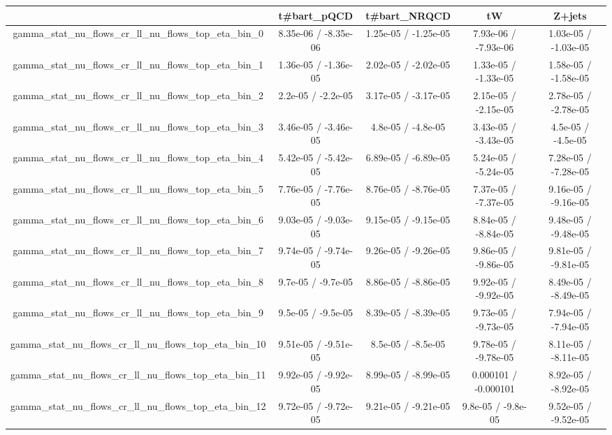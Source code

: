 \documentclass[10pt]{article}
\begin{document}
\begin{table}[htbp]
\begin{center}
\begin{tabular}{|c|c|c|c|c|}
\hline 
      & t#bar{t}_{pQCD}      & t#bar{t}_{NRQCD}      & tW      & Z+jets \\ 
\hline 
  gamma_stat_nu_flows_cr_ll_nu_flows_top_eta_bin_0 & 8.35e-06 / -8.35e-06 & 1.25e-05 / -1.25e-05 & 7.93e-06 / -7.93e-06 & 1.03e-05 / -1.03e-05 \\ 
  gamma_stat_nu_flows_cr_ll_nu_flows_top_eta_bin_1 & 1.36e-05 / -1.36e-05 & 2.02e-05 / -2.02e-05 & 1.33e-05 / -1.33e-05 & 1.58e-05 / -1.58e-05 \\ 
  gamma_stat_nu_flows_cr_ll_nu_flows_top_eta_bin_2 & 2.2e-05 / -2.2e-05 & 3.17e-05 / -3.17e-05 & 2.15e-05 / -2.15e-05 & 2.78e-05 / -2.78e-05 \\ 
  gamma_stat_nu_flows_cr_ll_nu_flows_top_eta_bin_3 & 3.46e-05 / -3.46e-05 & 4.8e-05 / -4.8e-05 & 3.43e-05 / -3.43e-05 & 4.5e-05 / -4.5e-05 \\ 
  gamma_stat_nu_flows_cr_ll_nu_flows_top_eta_bin_4 & 5.42e-05 / -5.42e-05 & 6.89e-05 / -6.89e-05 & 5.24e-05 / -5.24e-05 & 7.28e-05 / -7.28e-05 \\ 
  gamma_stat_nu_flows_cr_ll_nu_flows_top_eta_bin_5 & 7.76e-05 / -7.76e-05 & 8.76e-05 / -8.76e-05 & 7.37e-05 / -7.37e-05 & 9.16e-05 / -9.16e-05 \\ 
  gamma_stat_nu_flows_cr_ll_nu_flows_top_eta_bin_6 & 9.03e-05 / -9.03e-05 & 9.15e-05 / -9.15e-05 & 8.84e-05 / -8.84e-05 & 9.48e-05 / -9.48e-05 \\ 
  gamma_stat_nu_flows_cr_ll_nu_flows_top_eta_bin_7 & 9.74e-05 / -9.74e-05 & 9.26e-05 / -9.26e-05 & 9.86e-05 / -9.86e-05 & 9.81e-05 / -9.81e-05 \\ 
  gamma_stat_nu_flows_cr_ll_nu_flows_top_eta_bin_8 & 9.7e-05 / -9.7e-05 & 8.86e-05 / -8.86e-05 & 9.92e-05 / -9.92e-05 & 8.49e-05 / -8.49e-05 \\ 
  gamma_stat_nu_flows_cr_ll_nu_flows_top_eta_bin_9 & 9.5e-05 / -9.5e-05 & 8.39e-05 / -8.39e-05 & 9.73e-05 / -9.73e-05 & 7.94e-05 / -7.94e-05 \\ 
  gamma_stat_nu_flows_cr_ll_nu_flows_top_eta_bin_10 & 9.51e-05 / -9.51e-05 & 8.5e-05 / -8.5e-05 & 9.78e-05 / -9.78e-05 & 8.11e-05 / -8.11e-05 \\ 
  gamma_stat_nu_flows_cr_ll_nu_flows_top_eta_bin_11 & 9.92e-05 / -9.92e-05 & 8.99e-05 / -8.99e-05 & 0.000101 / -0.000101 & 8.92e-05 / -8.92e-05 \\ 
  gamma_stat_nu_flows_cr_ll_nu_flows_top_eta_bin_12 & 9.72e-05 / -9.72e-05 & 9.21e-05 / -9.21e-05 & 9.8e-05 / -9.8e-05 & 9.52e-05 / -9.52e-05 \\ 

\end{tabular}
\end{center}
\end{table}
\end{document}
